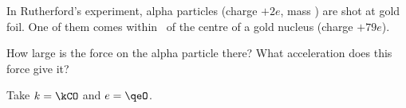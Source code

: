 In Rutherford's experiment, alpha particles (charge $+2e$, mass \maO) are shot at gold foil. One of them comes within \raO\ of the centre of a gold nucleus (charge $+79e$).

\begin{abcliste}
\abc How large is the force on the alpha particle there?
\abc What acceleration does this force give it?
\end{abcliste}

Take $k = \kCO$ and $e = \qeO$.
